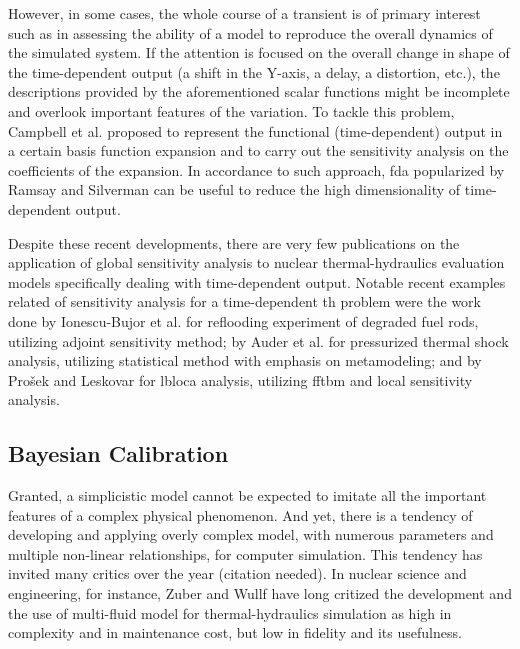However, in some cases, the whole course of a transient is of primary interest 
such as in assessing the ability of a model to reproduce the overall dynamics of the simulated system. 
If the attention is focused on the overall change in shape of the time-dependent output (a shift in the Y-axis, a delay, a distortion, etc.), 
the descriptions provided by the aforementioned scalar functions might be incomplete and overlook important features of the variation. 
To tackle this problem, Campbell et al. \cite{Campbell2006} proposed to represent the functional (time-dependent) output in a certain basis function expansion 
and to carry out the sensitivity analysis on the coefficients of the expansion. 
In accordance to such approach, \gls{fda} popularized by Ramsay and Silverman \cite{Ramsay2005} can be useful to reduce the high dimensionality of time-dependent output.

Despite these recent developments, 
there are very few publications on the application of global sensitivity analysis to nuclear thermal-hydraulics evaluation models specifically dealing with time-dependent output.
Notable recent examples related of sensitivity analysis for a time-dependent \gls{th} problem were the work done by Ionescu-Bujor et al. \cite{Ionescu-Bujor2005} 
for reflooding experiment of degraded fuel rods, utilizing adjoint sensitivity method; 
by Auder et al. \cite{Auder2012} for pressurized thermal shock analysis, 
utilizing statistical method with emphasis on metamodeling; 
and by Prošek and Leskovar \cite{Prosek2015} for \gls{lbloca} analysis, 
utilizing \gls{fftbm} and local sensitivity analysis.

\subsection{Bayesian Calibration}
Granted, a simplicistic model cannot be expected to imitate all the important features of a complex physical phenomenon.
And yet, there is a tendency of developing and applying overly complex model, with numerous parameters and multiple non-linear relationships, for computer simulation.
This tendency has invited many critics over the year (citation needed).
In nuclear science and engineering, for instance, Zuber \cite{Zuber2001} and Wullf \cite{Wulff2007} have long critized the development and the use of multi-fluid model for thermal-hydraulics simulation as high in complexity and in maintenance cost, but low in fidelity and its usefulness.

